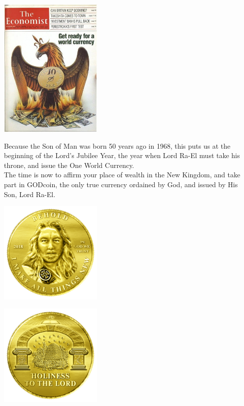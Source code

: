 \documentclass[12pt,a4paper]{article}
\begin{document}
  \begin{center}
    \includegraphics[width=50mm]{economist.png}\\
  \end{center}
  \vspace{3mm}

  Because the Son of Man was born 50 years ago in 1968, this puts us at the
  beginning of the Lord’s Jubilee Year, the year when Lord Ra-El must take his
  throne, and issue the One World Currency.\\

  The time is now to affirm your place of wealth in the New Kingdom, and take
  part in GODcoin, the only true currency ordained by God, and issued by His
  Son, Lord Ra-El.\\

  \begin{minipage}{.5\textwidth}
    \centering
    \includegraphics[width=50mm]{coin-front.png}\\
  \end{minipage}%
  \begin{minipage}{.5\textwidth}
    \centering
    \includegraphics[width=50mm]{coin-back.png}\\
  \end{minipage}
\end{document}
